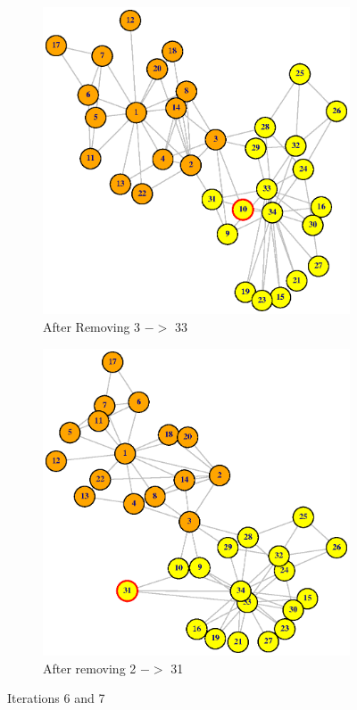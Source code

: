 \documentclass[12pt,letterpaper]{article}
\begin{document}
%
\begin{figure}
\centering
\begin{subfigure}{.5\textwidth}
  \centering
  \includegraphics[width=.9\linewidth]{Plot7}
  \caption{After Removing 3 $->$ 33 }
  \label{fig:sub1}
\end{subfigure}%
\begin{subfigure}{.5\textwidth}
  \centering
  \includegraphics[width=.9\linewidth]{Plot8}
  \caption{After removing 2 $->$ 31}
  \label{fig:sub2}
\end{subfigure}
\caption{Iterations 6 and 7}
\label{fig:test}
\end{figure}
\end{document}
